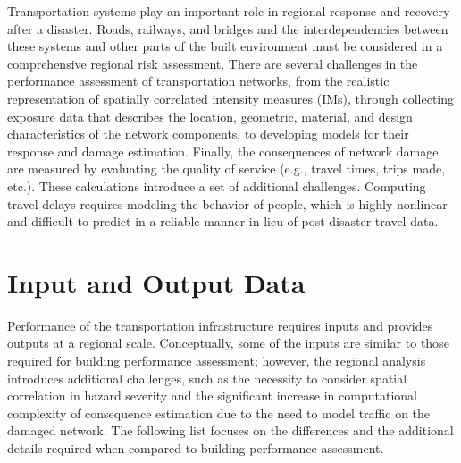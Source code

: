 Transportation systems play an important role in regional response and recovery after a disaster. Roads, railways, and bridges and the interdependencies between these systems and other parts of the built environment must be considered in a comprehensive regional risk assessment. There are several challenges in the performance assessment of transportation networks, from the realistic representation of spatially correlated intensity measures (IMs), through collecting exposure data that describes the location, geometric, material, and design characteristics of the network components, to developing models for their response and damage estimation. Finally, the consequences of network damage are measured by evaluating the quality of service (e.g., travel times, trips made, etc.). These calculations introduce a set of additional challenges. Computing travel delays requires modeling the behavior of people, which is highly nonlinear and difficult to predict in a reliable manner in lieu of post-disaster travel data.
 
\section{Input and Output Data}
\label{sec:perf_transport_io}

Performance of the transportation infrastructure requires inputs and provides outputs at a regional scale. Conceptually, some of the inputs are similar to those required for building performance assessment; however, the regional analysis introduces additional challenges, such as the necessity to consider spatial correlation in hazard severity and the significant increase in computational complexity of consequence estimation due to the need to model traffic on the damaged network. The following list focuses on the differences and the additional details required when compared to building performance assessment.

